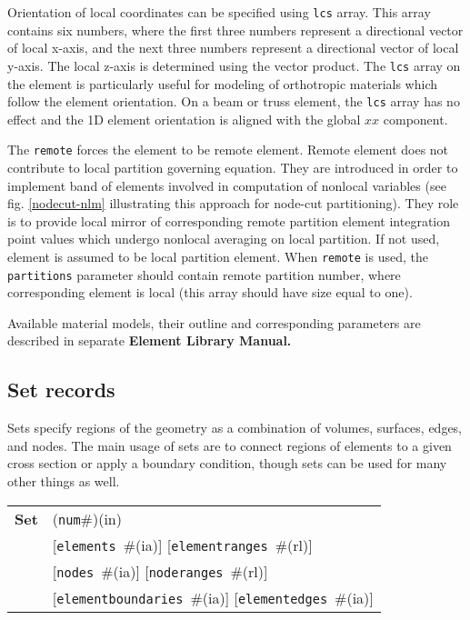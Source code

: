 \documentclass[a4paper]{article}
\makeatletter
\newcommand{\param}[1]{\texttt{#1}} %
\newcommand{\optional}[1]{[#1]} %
\newcommand{\field}[2]{\param{#1}~\#{\tiny(#2)}} %
\newcommand{\optField}[2]{\optional{\field{#1}{#2}}}
\newcommand{\componentNum}{(\param{num}\#){\tiny(in)}} %
\newcommand{\entKeywordInst}[1]{\textbf{#1}} %
\newcommand{\Pmode}[1]{{\sffamily #1}}
\newenvironment{record}[1][]{\begin{tabular}{|ll}}{\end{tabular}\\}
\newcommand{\recentry}[2]{{#1}&{#2}\\}
\newcounter{rcc}
\newenvironment{record}[1][\textwidth]{\setcounter{rcc}{0}\begin{tabular*}{#1}{|ll@{\extracolsep{\fill}}r}}{\end{tabular*}\\}
\newcommand{\recentry}[2]{\ifthenelse{\value{rcc}>0}{&$\backslash$ \\}{\setcounter{rcc}{1}}{#1}&{#2}}
\makeatother
\begin{document}
Orientation of local coordinates can be specified using \param{lcs} array. This array contains six numbers,
where the first three numbers represent a directional vector of local
x-axis, and the next three numbers represent a directional vector of local
y-axis. The local z-axis is determined using the vector product. The \param{lcs} array on the element is particularly useful for modeling of orthotropic materials which follow the element orientation. On a beam or truss element, the \param{lcs} array has no effect and the 1D element orientation is aligned with the global $xx$ component.

\Pmode{
The \param{remote} forces the element to be remote element. Remote
element does not contribute to local partition governing equation.
They are introduced in order to implement band of elements involved
in computation of nonlocal variables (see fig. \ref{nodecut-nlm} illustrating
this approach for node-cut partitioning). They role is to provide
local mirror of corresponding remote partition element integration point values which undergo
nonlocal averaging on local partition.
If not used, element is assumed to be local partition element.
When \param{remote} is used, the \param{partitions} parameter should
contain remote partition number, where
corresponding element is local (this array should have size equal to one).
}


Available material models, their outline and
corresponding parameters are described in separate \textbf{Element Library Manual.}


\subsection{Set records}
\label{_SetRecords}

Sets specify regions of the geometry as a combination of volumes, surfaces, edges, and nodes.
The main usage of sets are to connect regions of elements to a given cross section or apply a boundary condition, though sets can be used for many other things as well.

\begin{record}[0.9\textwidth]
  \recentry{\entKeywordInst{Set}}{\componentNum}
  \recentry{}{\optField{elements}{ia} \optField{elementranges}{rl}}
  \recentry{}{\optField{nodes}{ia} \optField{noderanges}{rl}}
  \recentry{}{\optField{elementboundaries}{ia} \optField{elementedges}{ia}}
\end{record}
\end{document}
